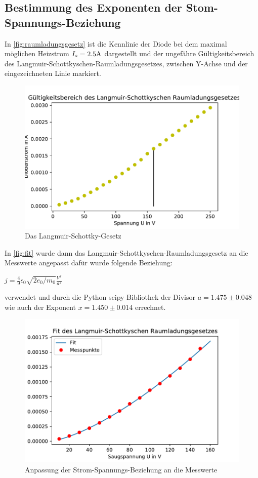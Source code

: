  \subsection{Bestimmung des Exponenten der Stom-Spannungs-Beziehung}
  \label{sec:exponent}
  In \autoref{fig:raumladungsgesetz} ist die Kennlinie der Diode bei dem maximal möglichen Heizstrom 
  $I_s=2.5\si[]{A}$ dargestellt und der ungefähre Gültigkeitsbereich des Langmuir-Schottkyschen-Raumladungsgesetzes, 
  zwischen Y-Achse und der eingezeichneten Linie markiert.
  \begin{figure}
    \centering
    \includegraphics{raumladungsgesetz.pdf}
    \caption{Das Langmuir-Schottky-Gesetz}
    \label{fig:raumladungsgesetz}
  \end{figure}
In \autoref{fig:fit} wurde dann das Langmuir-Schottkyschen-Raumladungsgesetz an die Messwerte angepasst dafür
wurde folgende Beziehung:
\begin{center}
  $j=\frac{4}{9}\epsilon_0\sqrt{2e_0/m_0}\frac{V^{x}}{a^2}$\\
\end{center}
verwendet und durch die Python scipy Bibliothek der Divisor $a=1.475\pm 0.048$ wie auch der Exponent
$x=1.450\pm 0.014$ errechnet.
  \begin{figure}
    \centering
    \includegraphics{fit.pdf}
    \caption{Anpassung der Strom-Spannungs-Beziehung an die Messwerte}
    \label{fig:fit}
  \end{figure}


